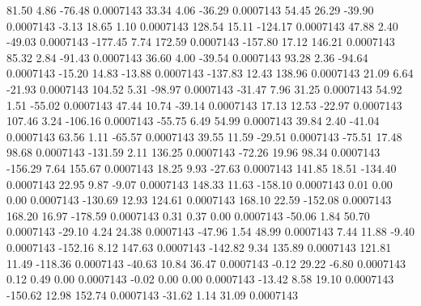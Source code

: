        81.50        4.86      -76.48     0.0007143
       33.34        4.06      -36.29     0.0007143
       54.45       26.29      -39.90     0.0007143
       -3.13       18.65        1.10     0.0007143
      128.54       15.11     -124.17     0.0007143
       47.88        2.40      -49.03     0.0007143
     -177.45        7.74      172.59     0.0007143
     -157.80       17.12      146.21     0.0007143
       85.32        2.84      -91.43     0.0007143
       36.60        4.00      -39.54     0.0007143
       93.28        2.36      -94.64     0.0007143
      -15.20       14.83      -13.88     0.0007143
     -137.83       12.43      138.96     0.0007143
       21.09        6.64      -21.93     0.0007143
      104.52        5.31      -98.97     0.0007143
      -31.47        7.96       31.25     0.0007143
       54.92        1.51      -55.02     0.0007143
       47.44       10.74      -39.14     0.0007143
       17.13       12.53      -22.97     0.0007143
      107.46        3.24     -106.16     0.0007143
      -55.75        6.49       54.99     0.0007143
       39.84        2.40      -41.04     0.0007143
       63.56        1.11      -65.57     0.0007143
       39.55       11.59      -29.51     0.0007143
      -75.51       17.48       98.68     0.0007143
     -131.59        2.11      136.25     0.0007143
      -72.26       19.96       98.34     0.0007143
     -156.29        7.64      155.67     0.0007143
       18.25        9.93      -27.63     0.0007143
      141.85       18.51     -134.40     0.0007143
       22.95        9.87       -9.07     0.0007143
      148.33       11.63     -158.10     0.0007143
        0.01        0.00        0.00     0.0007143
     -130.69       12.93      124.61     0.0007143
      168.10       22.59     -152.08     0.0007143
      168.20       16.97     -178.59     0.0007143
        0.31        0.37        0.00     0.0007143
      -50.06        1.84       50.70     0.0007143
      -29.10        4.24       24.38     0.0007143
      -47.96        1.54       48.99     0.0007143
        7.44       11.88       -9.40     0.0007143
     -152.16        8.12      147.63     0.0007143
     -142.82        9.34      135.89     0.0007143
      121.81       11.49     -118.36     0.0007143
      -40.63       10.84       36.47     0.0007143
       -0.12       29.22       -6.80     0.0007143
        0.12        0.49        0.00     0.0007143
       -0.02        0.00        0.00     0.0007143
      -13.42        8.58       19.10     0.0007143
     -150.62       12.98      152.74     0.0007143
      -31.62        1.14       31.09     0.0007143

